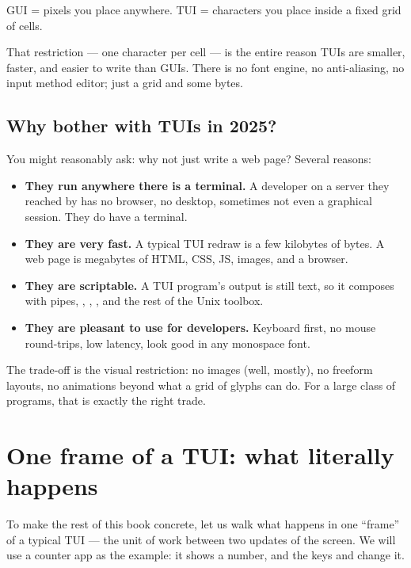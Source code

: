 \begin{idea}
GUI = pixels you place anywhere. TUI = characters you place inside a
fixed grid of cells.
\end{idea}

That restriction --- one character per cell --- is the entire reason
TUIs are smaller, faster, and easier to write than GUIs. There is no
font engine, no anti-aliasing, no input method editor; just a grid and
some bytes.

\subsection{Why bother with TUIs in 2025?}

You might reasonably ask: why not just write a web page? Several
reasons:

\begin{itemize}[leftmargin=*]
  \item \textbf{They run anywhere there is a terminal.} A developer
    on a server they reached by  has no browser, no
    desktop, sometimes not even a graphical session. They do have a
    terminal.
  \item \textbf{They are very fast.} A typical TUI redraw is a few
    kilobytes of bytes. A web page is megabytes of HTML, CSS, JS,
    images, and a browser.
  \item \textbf{They are scriptable.} A TUI program's output is
    still text, so it composes with pipes, , ,
    , and the rest of the Unix toolbox.
  \item \textbf{They are pleasant to use for developers.} Keyboard
    first, no mouse round-trips, low latency, look good in any
    monospace font.
\end{itemize}

The trade-off is the visual restriction: no images (well, mostly), no
freeform layouts, no animations beyond what a grid of glyphs can do.
For a large class of programs, that is exactly the right trade.

\section{One frame of a TUI: what literally happens}
\label{sec:intro:one-frame}

To make the rest of this book concrete, let us walk what happens in
one ``frame'' of a typical TUI --- the unit of work between two
updates of the screen. We will use a counter app as the example: it
shows a number, and the keys \code{+} and \code{-} change it.

